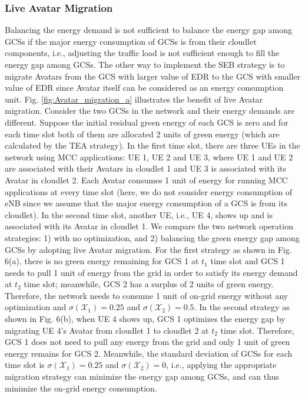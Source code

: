 \documentclass[journal,12pt,draftclsnofoot,onecolumn]{IEEEtran}
\begin{document}
\subsubsection{Live Avatar Migration}
Balancing the energy demand is not sufficient to balance the energy gap among GCSs if the major energy consumption of GCSs is from their cloudlet components, i.e., adjusting the traffic load is not sufficient enough to fill the energy gap among GCSs. The other way to implement the SEB strategy is to migrate Avatars from the GCS with larger value of EDR to the GCS with smaller value of EDR since Avatar itself can be considered as an energy consumption unit. Fig. \ref{fig:Avatar_migration_a} illustrates the benefit of live Avatar migration. Consider the two GCSs in the network and their energy demands are different. Suppose the initial residual green energy of each GCS is zero and for each time slot both of them are allocated 2 units of green energy (which are calculated by the TEA strategy). In the first time slot, there are three UEs in the network using MCC applications: UE 1, UE 2 and UE 3, where UE 1 and UE 2 are associated with their Avatars in cloudlet 1 and UE 3 is associated with its Avatar in cloudlet 2. Each Avatar consumes 1 unit of energy for running MCC applications at every time slot (here, we do not consider energy consumption of eNB since we assume that the major energy consumption of a GCS is from its cloudlet). In the second time slot, another UE, i.e., UE 4, shows up and is associated with its Avatar in cloudlet 1. We compare the two network operation strategies: 1) with no optimization, and 2) balancing the green energy gap among GCSs by adopting live Avatar migration. For the first strategy as shown in Fig. 6(a), there is no green energy remaining for GCS 1 at $t_1$ time slot and GCS 1 needs to pull 1 unit of energy from the grid in order to satisfy its energy demand at $t_2$ time slot; meanwhile, GCS 2 has a surplus of 2 units of green energy. Therefore, the network needs to consume 1 unit of on-grid energy without any optimization and $\sigma \left( {{\bm{\mathcal{X}}_1}} \right) = 0.25$ and $\sigma \left( {{\bm{\mathcal{X}}_2}} \right) = 0.5$. In the second strategy as shown in Fig. 6(b), when UE 4 shows up, GCS 1 optimizes the energy gap by migrating UE 4's Avatar from cloudlet 1 to cloudlet 2 at $t_2$ time slot. Therefore, GCS 1 does not need to pull any energy from the grid and only 1 unit of green energy remains for GCS 2. Meanwhile, the standard deviation of GCSs for each time slot is $\sigma \left( {{\bm{\mathcal{X}}_1}} \right) = 0.25$ and $\sigma \left( {{\bm{\mathcal{X}}_2}} \right) = 0$, i.e., applying the appropriate migration strategy can minimize the energy gap among GCSs, and can thus minimize the on-grid energy consumption.
\end{document}
